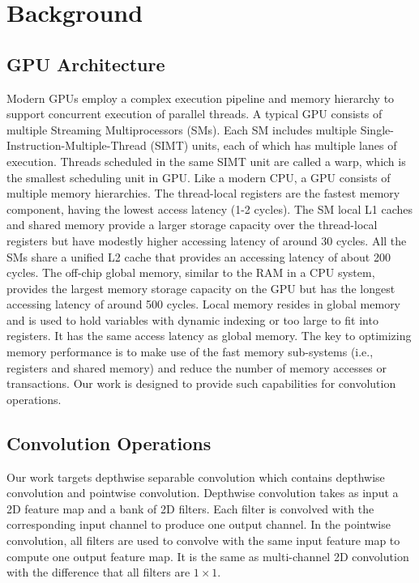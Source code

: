 
\section{Background}
\subsection{GPU Architecture}
Modern GPUs employ a complex execution pipeline and memory hierarchy to support concurrent execution of parallel threads. 
A typical GPU consists of multiple Streaming Multiprocessors (SMs). 
Each SM includes multiple Single-Instruction-Multiple-Thread (SIMT) units, each of which has multiple lanes of execution. 
Threads scheduled in the same SIMT unit are called a warp, which is the smallest scheduling unit in GPU. 
Like a modern CPU, a GPU consists of multiple memory hierarchies. 
The thread-local registers are the fastest memory component, having the lowest access latency (1-2 cycles). 
The SM local L1 caches and shared memory provide a larger storage capacity over the thread-local registers but have modestly higher accessing latency of around 30 cycles. 
All the SMs share a unified L2 cache that provides an accessing latency of about 200 cycles. 
The off-chip global memory, similar to the RAM in a CPU system, provides the largest memory storage capacity on the GPU but has the longest accessing latency of around 500 cycles. 
Local memory resides in global memory and is used to hold variables with dynamic indexing or too large to fit into registers. 
It has the same access latency as global memory. 
The key to optimizing memory performance is to make use of the fast memory sub-systems (i.e., registers and shared memory) and reduce the number of memory accesses or transactions. 
Our work is designed to provide such capabilities for convolution operations.

\subsection{Convolution Operations}
Our work targets depthwise separable convolution which contains depthwise convolution and pointwise convolution. 
Depthwise convolution takes as input a 2D feature map and a bank of 2D filters. Each filter is convolved with the corresponding input channel to produce one output channel. 
In the pointwise convolution, all filters are used to convolve with the same input feature map to compute one output feature map. It is the same as multi-channel 2D convolution with the difference that all filters are $1 \times 1$.


